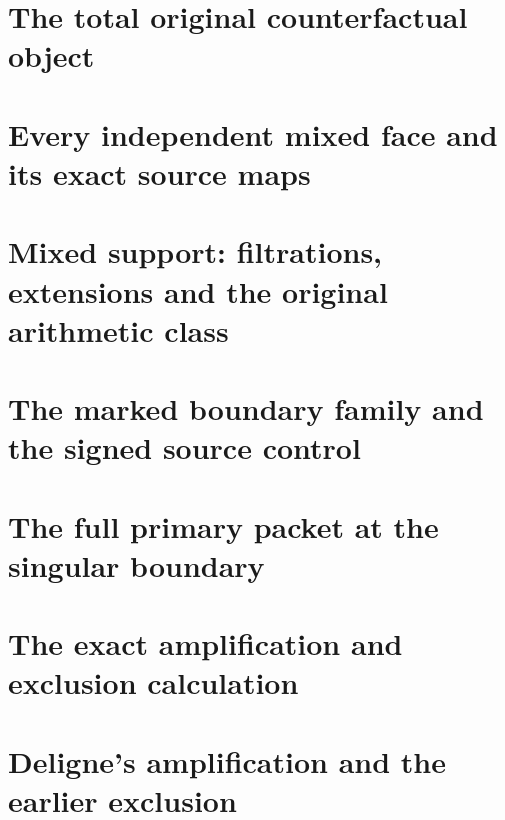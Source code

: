 \chapter{The total original counterfactual object}



\chapter{Every independent mixed face and its exact source maps}




\chapter{Mixed support: filtrations, extensions and the original arithmetic class}



\chapter{The marked boundary family and the signed source control}



\chapter{The full primary packet at the singular boundary}

\chapter{The exact amplification and exclusion calculation}


\chapter{Deligne's amplification and the earlier exclusion}



